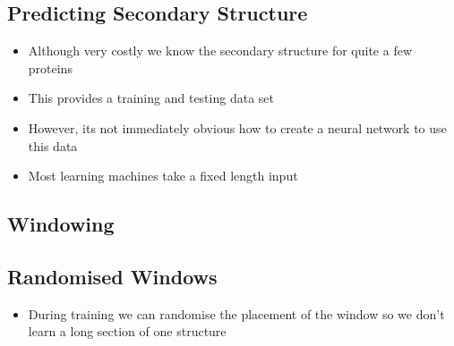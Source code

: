 \begin{slide}
\section{Predicting Secondary Structure}

\begin{PauseHighLight}
  \begin{itemize}
  \item Although very costly we know the secondary structure for quite a
    few proteins\pause
  \item This provides a training and testing data set\pause
  \item However, its not immediately obvious how to create a neural
    network to use this data\pause
  \item Most learning machines take a fixed length input\pause
  \end{itemize}
\end{PauseHighLight}

\end{slide}


\begin{slide}
\section{Windowing}
\pause
\pb
{}
\begin{center}
  \pause
\end{center}

\end{slide}


\begin{slide}
\section{Randomised Windows}
\pause
\pb
\begin{itemize}
\item During training we can randomise the placement of the window so we
  don't learn a long section of one structure\pauseh
{}

\begin{center}
  \pause
\end{center}

\end{itemize}

\end{slide}


